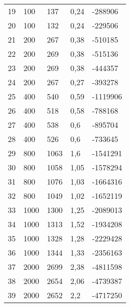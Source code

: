\begin{longtable}{lllll}
    19               & 100            & 137            & 0,24     & -288906         \\
    20               & 100            & 132            & 0,24     & -229506         \\
    21               & 200            & 267            & 0,38     & -510185         \\
    22               & 200            & 269            & 0,38     & -515136         \\
    23               & 200            & 269            & 0,38     & -444357         \\
    24               & 200            & 267            & 0,27     & -393278         \\
    25               & 400            & 540            & 0,59     & -1119906        \\
    26               & 400            & 518            & 0,58     & -788168         \\
    27               & 400            & 538            & 0,6     & -895704         \\
    28               & 400            & 526            & 0,6     & -733645         \\
    29               & 800            & 1063           & 1,6     & -1541291        \\
    30               & 800            & 1058           & 1,05     & -1578294        \\
    31               & 800            & 1076           & 1,03     & -1664316        \\
    32               & 800            & 1049           & 1,02     & -1652119        \\
    33               & 1000           & 1300           & 1,25     & -2089013        \\
    34               & 1000           & 1313           & 1,52     & -1934208        \\
    35               & 1000           & 1328           & 1,28     & -2229428        \\
    36               & 1000           & 1344           & 1,33     & -2356163        \\
    37               & 2000           & 2699           & 2,38     & -4811598        \\
    38               & 2000           & 2654           & 2,06     & -4739387        \\
    39               & 2000           & 2652           & 2,2     & -4717250        \\

\end{longtable}
